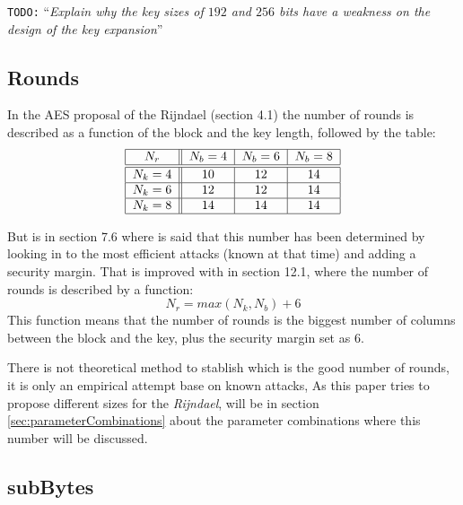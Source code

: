 \documentclass[10pt,a4paper,twoside]{llncs}
\newcommand{\todo}[1]{\texttt{\color{red}TODO:} ``\emph{#1}''}
\newcommand{\rijndael}{\emph{Rijndael}}
\begin{document}
\todo{Explain why the key sizes of $192$ and $256$ bits have a weakness on the design of the key expansion}

\subsection{Rounds}\label{sec:rounds}

In the AES proposal of the Rijndael \cite{Daemen01aes-ammended} (section 4.1) the number of rounds is described as a function of the block and the key length, followed by the table:
\begin{equation}\label{tab:nrounds}
\begin{tabular}{|c||c|c|c|}
\hline
$N_r$     & $N_b = 4$ & $N_b = 6$ & $N_b = 8$ \\ \hline\hline
$N_k = 4$ &    $10$   &    $12$   &    $14$   \\ \hline
$N_k = 6$ &    $12$   &    $12$   &    $14$   \\ \hline
$N_k = 8$ &    $14$   &    $14$   &    $14$   \\ \hline
\end{tabular}
\end{equation}

 But is in section 7.6 where is said that this number has been determined by looking in to the most efficient attacks (known at that time) and adding a security margin. That is improved with in section 12.1, where the number of rounds is described by a function:
\begin{equation}\label{eq:nrounds}
 N_r = max(N_k,N_b)+6
\end{equation}
This function means that the number of rounds is the biggest number of columns between the block and the key, plus the security margin set as $6$.

There is not theoretical method to stablish which is the good number of rounds, it is only an empirical attempt base on known attacks, As this paper tries to propose different sizes for the \rijndael, will be in section \ref{sec:parameterCombinations} about the parameter combinations where this number will be discussed.


\subsection{subBytes}\label{sec:subBytes}
\end{document}

